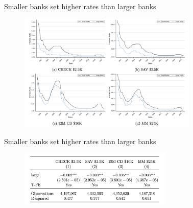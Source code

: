 \documentclass[notes,10pt, aspectratio=169]{beamer}
\begin{document}
            
\begin{frame}{Smaller banks set higher rates than larger banks}


    \begin{figure}
        \centering
        \includegraphics[width=0.76\textwidth]{imgs/fig1.png}
    \end{figure}
    
\end{frame}

\begin{frame}{Smaller banks set higher rates than larger banks}

    \begin{figure}
        \centering
        \includegraphics[width=0.65\textwidth]{imgs/tab3.png}
    \end{figure}

\end{frame}
    
\end{document}
